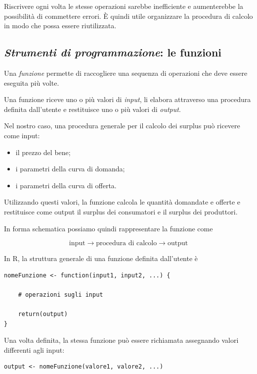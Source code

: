 Riscrivere ogni volta le stesse operazioni sarebbe inefficiente
e aumenterebbe la possibilità di commettere errori. È quindi utile
organizzare la procedura di calcolo in modo che possa essere
riutilizzata.


\subsection{\textbf{\textit{Strumenti di programmazione}}: le funzioni}

Una \emph{funzione} permette di raccogliere una sequenza di
operazioni che deve essere eseguita più volte.

Una funzione riceve uno o più valori di \emph{input}, li elabora
attraverso una procedura definita dall'utente e restituisce uno o
più valori di \emph{output}.

Nel nostro caso, una procedura generale per il calcolo dei surplus
può ricevere come input:

\begin{itemize}
    \item il prezzo del bene;
    \item i parametri della curva di domanda;
    \item i parametri della curva di offerta.
\end{itemize}

Utilizzando questi valori, la funzione calcola le quantità domandate
e offerte e restituisce come output il surplus dei consumatori e il
surplus dei produttori.

In forma schematica possiamo quindi rappresentare la funzione come

\begin{equation*}
\boxed{
\text{input}
\longrightarrow
\text{procedura di calcolo}
\longrightarrow
\text{output}
}
\end{equation*}

In \textsf{R}, la struttura generale di una funzione definita
dall'utente è

\begin{verbatim}
nomeFunzione <- function(input1, input2, ...) {

    # operazioni sugli input

    return(output)
}
\end{verbatim}

Una volta definita, la stessa funzione può essere richiamata
assegnando valori differenti agli input:

\begin{verbatim}
output <- nomeFunzione(valore1, valore2, ...)
\end{verbatim}

